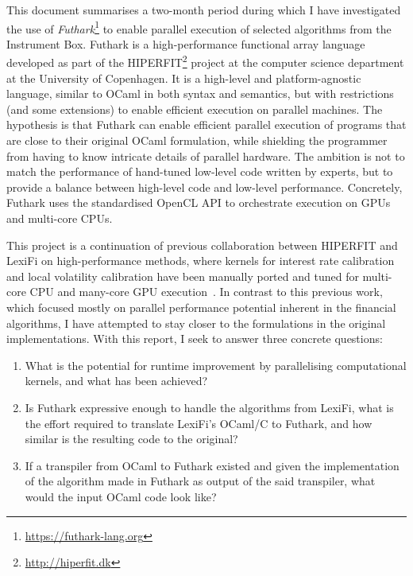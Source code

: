 \documentclass{article}
\begin{document}
This document summarises a two-month period during which I have
investigated the use of
\textit{Futhark}\footnote{\url{https://futhark-lang.org}} to enable
parallel execution of selected algorithms from the Instrument Box.
Futhark is a high-performance functional array language developed as
part of the HIPERFIT\footnote{\url{http://hiperfit.dk}} project at the
computer science department at the University of Copenhagen.  It is a
high-level and platform-agnostic language, similar to OCaml in both
syntax and semantics, but with restrictions (and some extensions) to
enable efficient execution on parallel machines.  The hypothesis is
that Futhark can enable efficient parallel execution of programs that
are close to their original OCaml formulation, while shielding the
programmer from having to know intricate details of parallel hardware.
The ambition is not to match the performance of hand-tuned low-level
code written by experts, but to provide a balance between high-level
code and low-level performance.  Concretely, Futhark uses the
standardised OpenCL API to orchestrate execution on GPUs and
multi-core CPUs.

This project is a continuation of previous collaboration between
HIPERFIT and LexiFi on high-performance methods, where kernels for
interest rate calibration and local volatility calibration have been
manually ported and tuned for multi-core CPU and many-core GPU
execution~\cite{FinPar:TACO}.  In contrast to this previous work, which
focused mostly on parallel performance potential inherent in the
financial algorithms, I have attempted to stay closer to the
formulations in the original implementations.  With this report, I
seek to answer three concrete questions:

\begin{enumerate}
\item What is the potential for runtime improvement by parallelising
  computational kernels, and what has been achieved?

\item Is Futhark expressive enough to handle the algorithms from
  LexiFi, what is the effort required to translate LexiFi's OCaml/C to
  Futhark, and how similar is the resulting code to the original?

\item If a transpiler from OCaml to Futhark existed and given the
  implementation of the algorithm made in Futhark as output of the
  said transpiler, what would the input OCaml code look like?
\end{enumerate}
\end{document}
